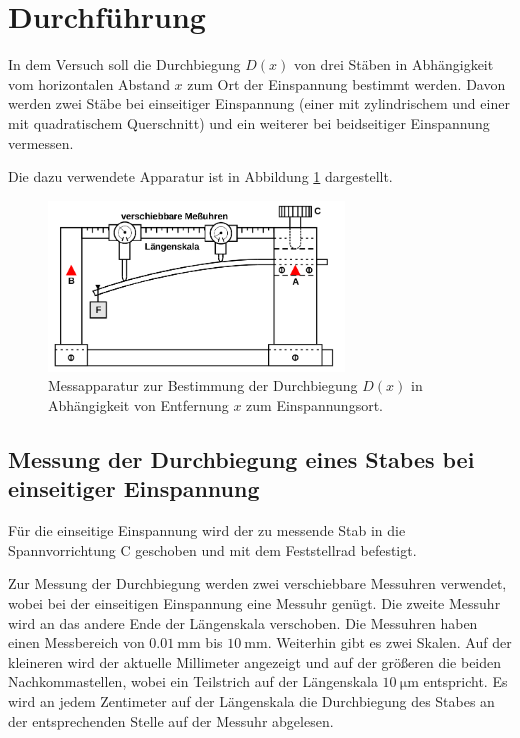 \section{Durchführung}
\label{sec:Durchführung}

In dem Versuch soll die Durchbiegung $D(x)$ von drei Stäben in Abhängigkeit vom horizontalen 
Abstand $x$ zum Ort der Einspannung bestimmt werden.
Davon werden zwei Stäbe bei einseitiger Einspannung (einer mit zylindrischem und einer mit 
quadratischem Querschnitt) und ein weiterer bei beidseitiger Einspannung vermessen. 

Die dazu verwendete Apparatur ist in Abbildung \ref{fig:aufbauamk} dargestellt.
\begin{figure}
	\centering
	\includegraphics[width=0.7\textwidth]{Bilder/Aufbau_Messung.png}
	\caption{Messapparatur zur Bestimmung der Durchbiegung $D(x)$ in Abhängigkeit von
	Entfernung $x$ zum Einspannungsort. \cite{Anleitung}}
	\label{fig:aufbauamk}
\end{figure}
\subsection{Messung der Durchbiegung eines Stabes bei einseitiger Einspannung}
Für die einseitige Einspannung wird der zu messende Stab in die Spannvorrichtung C geschoben und mit dem Feststellrad befestigt.

Zur Messung der Durchbiegung werden zwei verschiebbare Messuhren verwendet, wobei bei der 
einseitigen Einspannung eine Messuhr genügt. Die zweite Messuhr wird an das andere Ende der
Längenskala verschoben.
Die Messuhren haben einen Messbereich von $\SI{0,01}{\milli\meter}$ bis $\SI{10}{\milli\meter}$.
Weiterhin gibt es zwei Skalen. Auf der kleineren wird der aktuelle Millimeter angezeigt und 
auf der größeren die beiden Nachkommastellen, wobei ein Teilstrich auf der Längenskala 
$\SI{10}{\micro\meter}$ entspricht.
Es wird an jedem Zentimeter auf der Längenskala die Durchbiegung des Stabes an der 
entsprechenden Stelle auf der Messuhr abgelesen.

